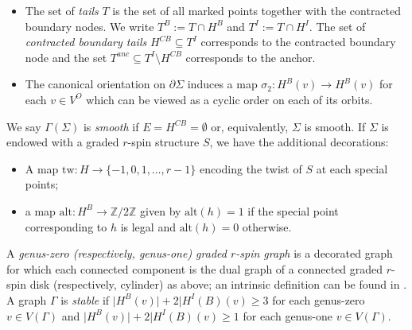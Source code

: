 \documentclass[11pt]{amsart}
\theoremstyle{definition}
\theoremstyle{remark}
\newcommand{\<}{\left<}
\renewcommand{\>}{\right>}
\numberwithin{equation}{section}
\begin{document}
\begin{itemize}
\item The set of \textit{tails} $T$ is the set of all marked points together with the contracted boundary nodes. We write $T^B:=T\cap H^B$ and $T^I:=T\cap H^I$. The set of \textit{contracted boundary tails} $H^{CB}\subseteq T^I$ corresponds to the contracted boundary node and the set $T^{anc}\subseteq T^I\setminus H^{CB}$ corresponds to the anchor.
\item 
The canonical orientation on %
$\partial\Sigma$ induces a %
map $\sigma_2\colon H^B(v) \to H^B(v)$ for each %
$v\in V^O$ which %
can be viewed as a cyclic order on each of its orbits.
\end{itemize}
We say $\Gamma(\Sigma)$ is \textit{smooth} if %
$E = H^{CB} = \emptyset$ or, equivalently, %
$\Sigma$ is smooth.
If $\Sigma$ is endowed with a graded $r$-spin structure $S$, we have the additional %
decorations:
\begin{itemize}
    \item A map %
$\text{tw}: H \rightarrow \{-1,0,1,\ldots, r-1\}$ encoding the twist of $S$ at each special points;
    \item a map
$\text{alt}: H^B \rightarrow \mathbb{Z}/2\mathbb{Z}$
given by $\text{alt}(h) = 1$ if the special point corresponding to $h$ is legal and $\text{alt}(h) = 0$ otherwise.
\end{itemize}



A \textit{genus-zero (respectively, genus-one) graded $r$-spin graph} is a decorated graph for which each connected component is the dual graph of a connected graded $r$-spin disk (respectively, cylinder) as above; an intrinsic definition can be found in \cite[\S 3.2]{TZ1}. A graph $\Gamma$ is \textit{stable} if $\lvert H^B(v)\rvert +2\lvert H^I(B)(v)\ge 3$ for each genus-zero $v\in V(\Gamma)$ and $\lvert H^B(v)\rvert +2\lvert H^I(B)(v)\ge 1$ for each genus-one $v\in V(\Gamma)$.
\end{document}
